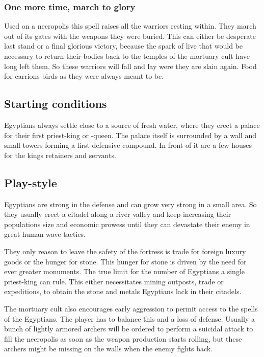 \documentclass[a4paper]{article}
\begin{document}
		\subsubsection{One more time, march to glory}
			Used on a necropolis this spell raises all the warriors resting within.
			They march out of its gates with the weapons they were buried.
			This can either be desperate last stand or a final glorious victory,
			because the spark of live that would be necessary
			to return their bodies back to the temples of the mortuary cult
			have long left them.
			So these warriors will fall and lay were they are slain again.
			Food for carrions birds as they were always meant to be.

	\subsection{Starting conditions}
		\Gls{Egyptians} always settle close to a source of fresh water,
		where they erect a palace for their first priest-king or -queen.
		The palace itself is surrounded by a wall and small towers forming a first defensive compound.
		In front of it are a few houses for the kings retainers and servants.

	\subsection{Play-style}
		\Gls{Egyptians} are strong in the defense and can grow very strong in a small area.
		So they usually erect a citadel along a river valley and keep increasing
		their populations size and economic prowess until they can devastate their enemy 
		in great human wave tactics.

		They only reason to leave the safety of the fortress is trade for foreign luxury
		goods or the hunger for stone.
		This hunger for stone is driven by the need for ever greater monuments.
		The true limit for the number of \gls{Egyptians} a single priest-king
		can rule.
		This either necessitates mining outposts, trade or expeditions,
		to obtain the stone and metals \gls{Egyptians} lack in their citadels.

		The mortuary cult also encourages early aggression to permit access to the
		spells of the \gls{Egyptians}.
		The player has to balance this and a loss of defense.
		Usually a bunch of lightly armored archers will be ordered to perform
		a suicidal attack to fill the necropolis as soon as the weapon production
		starts rolling,
		but these archers might be missing on the walls when the enemy fights back.
\end{document}
